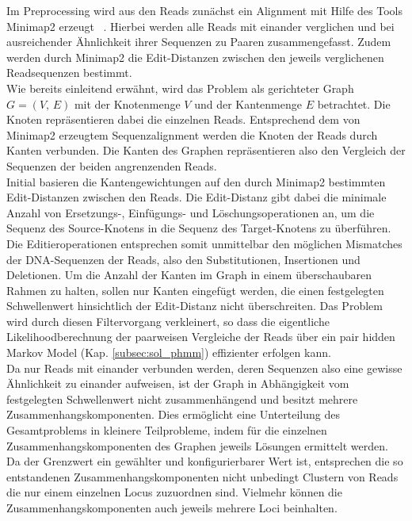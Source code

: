 Im Preprocessing wird aus den Reads zunächst ein Alignment mit Hilfe des Tools Minimap2  erzeugt ~\cite{li_2018}. Hierbei werden alle Reads mit einander verglichen und bei ausreichender Ähnlichkeit ihrer Sequenzen zu Paaren zusammengefasst. Zudem werden durch Minimap2 die Edit-Distanzen zwischen den jeweils verglichenen Readsequenzen bestimmt. \\

Wie bereits einleitend erwähnt, wird das Problem als gerichteter Graph $G=(V, \, E)$ mit der Knotenmenge $V$ und der Kantenmenge $E$ betrachtet. Die Knoten repräsentieren dabei die einzelnen Reads. Entsprechend dem von Minimap2 erzeugtem Sequenzalignment werden die Knoten der Reads durch Kanten verbunden. Die Kanten des Graphen repräsentieren also den Vergleich der Sequenzen der beiden angrenzenden Reads.\\

Initial basieren die Kantengewichtungen auf den durch Minimap2 bestimmten Edit-Distanzen zwischen den Reads. Die Edit-Distanz gibt dabei die minimale Anzahl von Ersetzungs-, Einfügungs- und Löschungsoperationen an, um die Sequenz des Source-Knotens in die Sequenz des Target-Knotens zu überführen. Die Editieroperationen entsprechen somit unmittelbar den möglichen Mismatches der DNA-Sequenzen der Reads, also den Substitutionen, Insertionen und Deletionen. Um die Anzahl der Kanten im Graph in einem überschaubaren Rahmen zu halten, sollen nur Kanten eingefügt werden, die einen festgelegten Schwellenwert hinsichtlich der Edit-Distanz nicht überschreiten. Das Problem wird durch diesen Filtervorgang verkleinert, so dass die eigentliche Likelihoodberechnung der paarweisen Vergleiche der Reads über ein pair hidden Markov Model (Kap. \ref{subsec:sol_phmm}) effizienter erfolgen kann. \\

Da nur Reads mit einander verbunden werden, deren Sequenzen also eine gewisse Ähnlichkeit zu einander aufweisen, ist der Graph in Abhängigkeit vom festgelegten Schwellenwert nicht zusammenhängend und besitzt mehrere Zusammenhangskomponenten. Dies ermöglicht eine Unterteilung des Gesamtproblems in kleinere Teilprobleme, indem für die einzelnen Zusammenhangskomponenten des Graphen jeweils Lösungen ermittelt werden. Da der Grenzwert ein gewählter und konfigurierbarer Wert ist, entsprechen die so entstandenen Zusammenhangskomponenten nicht unbedingt Clustern von Reads die nur einem einzelnen Locus zuzuordnen sind. Vielmehr können die Zusammenhangskomponenten auch jeweils mehrere Loci beinhalten. 

